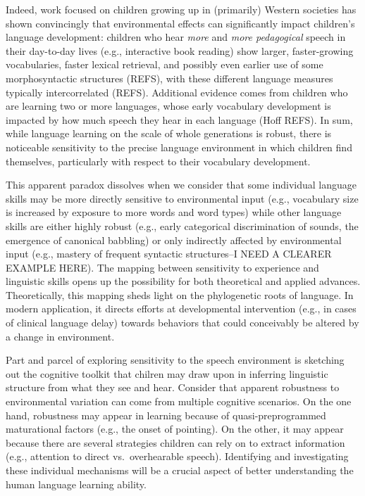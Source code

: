 \documentclass[floatsintext,man]{apa6}
\theoremstyle{definition}
\theoremstyle{definition}
\theoremstyle{definition}
\theoremstyle{remark}
\begin{document}
Indeed, work focused on children growing up in (primarily) Western
societies has shown convincingly that environmental effects can
significantly impact children's language development: children who hear
\emph{more} and \emph{more pedagogical} speech in their day-to-day lives
(e.g., interactive book reading) show larger, faster-growing
vocabularies, faster lexical retrieval, and possibly even earlier use of
some morphosyntactic structures (REFS), with these different language
measures typically intercorrelated (REFS). Additional evidence comes
from children who are learning two or more languages, whose early
vocabulary development is impacted by how much speech they hear in each
language (Hoff REFS). In sum, while language learning on the scale of
whole generations is robust, there is noticeable sensitivity to the
precise language environment in which children find themselves,
particularly with respect to their vocabulary development.

This apparent paradox dissolves when we consider that some individual
language skills may be more directly sensitive to environmental input
(e.g., vocabulary size is increased by exposure to more words and word
types) while other language skills are either highly robust (e.g., early
categorical discrimination of sounds, the emergence of canonical
babbling) or only indirectly affected by environmental input (e.g.,
mastery of frequent syntactic structures--I NEED A CLEARER EXAMPLE
HERE). The mapping between sensitivity to experience and linguistic
skills opens up the possibility for both theoretical and applied
advances. Theoretically, this mapping sheds light on the phylogenetic
roots of language. In modern application, it directs efforts at
developmental intervention (e.g., in cases of clinical language delay)
towards behaviors that could conceivably be altered by a change in
environment.

Part and parcel of exploring sensitivity to the speech environment is
sketching out the cognitive toolkit that chilren may draw upon in
inferring linguistic structure from what they see and hear. Consider
that apparent robustness to environmental variation can come from
multiple cognitive scenarios. On the one hand, robustness may appear in
learning because of quasi-preprogrammed maturational factors (e.g., the
onset of pointing). On the other, it may appear because there are
several strategies children can rely on to extract information (e.g.,
attention to direct vs.~overhearable speech). Identifying and
investigating these individual mechanisms will be a crucial aspect of
better understanding the human language learning ability.
\end{document}
